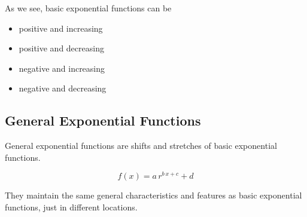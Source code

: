 \documentclass{ximera}
\begin{document}
As we see, basic exponential functions can be

\begin{itemize}
\item positive and increasing
\item positive and decreasing
\item negative and increasing
\item negative and decreasing
\end{itemize}




















\subsection{General Exponential Functions}


General exponential functions are shifts and stretches of basic exponential functions.  


\[
f(x) = a \, r^{b \, x + c} + d
\]



They maintain the same general characteristics and features as basic exponential functions, just in different locations.
\end{document}
